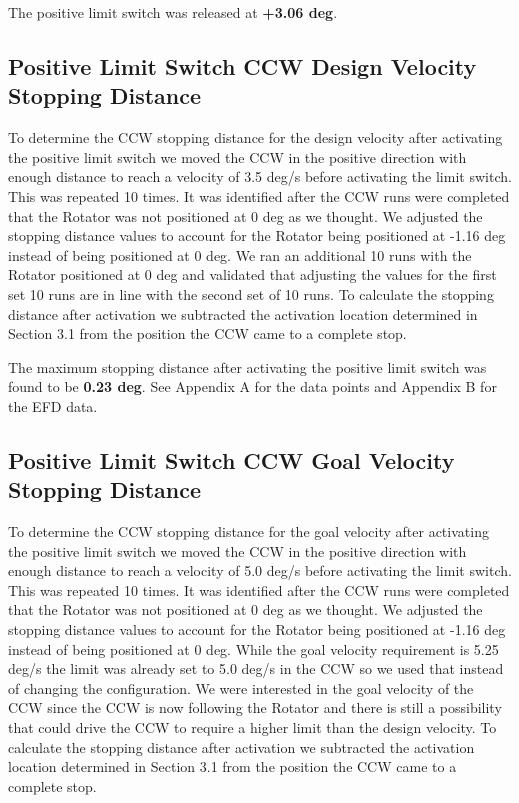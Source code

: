 \documentclass[SE,lsstdraft,authoryear,toc]{lsstdoc}
\begin{document}
The positive limit switch was released at \textbf{+3.06 deg}.

\hypertarget{positive-limit-switch-ccw-design-velocity-stopping-distance}{%
\subsection{Positive Limit Switch CCW Design Velocity Stopping
Distance}\label{positive-limit-switch-ccw-design-velocity-stopping-distance}}

To determine the CCW stopping distance for the design velocity after
activating the positive limit switch we moved the CCW in the positive
direction with enough distance to reach a velocity of 3.5 deg/s before
activating the limit switch. This was repeated 10 times. It was
identified after the CCW runs were completed that the Rotator was not
positioned at 0 deg as we thought. We adjusted the stopping distance
values to account for the Rotator being positioned at -1.16 deg instead
of being positioned at 0 deg. We ran an additional 10 runs with the
Rotator positioned at 0 deg and validated that adjusting the values for
the first set 10 runs are in line with the second set of 10 runs. To
calculate the stopping distance after activation we subtracted the
activation location determined in Section 3.1 from the position the CCW
came to a complete stop.

The maximum stopping distance after activating the positive limit switch
was found to be \textbf{0.23 deg}. See Appendix A for the data points
and Appendix B for the EFD data.

\hypertarget{positive-limit-switch-ccw-goal-velocity-stopping-distance}{%
\subsection{Positive Limit Switch CCW Goal Velocity Stopping
Distance}\label{positive-limit-switch-ccw-goal-velocity-stopping-distance}}

To determine the CCW stopping distance for the goal velocity after
activating the positive limit switch we moved the CCW in the positive
direction with enough distance to reach a velocity of 5.0 deg/s before
activating the limit switch. This was repeated 10 times. It was
identified after the CCW runs were completed that the Rotator was not
positioned at 0 deg as we thought. We adjusted the stopping distance
values to account for the Rotator being positioned at -1.16 deg instead
of being positioned at 0 deg. While the goal velocity requirement is
5.25 deg/s the limit was already set to 5.0 deg/s in the CCW so we used
that instead of changing the configuration. We were interested in the
goal velocity of the CCW since the CCW is now following the Rotator and
there is still a possibility that could drive the CCW to require a
higher limit than the design velocity. To calculate the stopping
distance after activation we subtracted the activation location
determined in Section 3.1 from the position the CCW came to a complete
stop.
\end{document}
